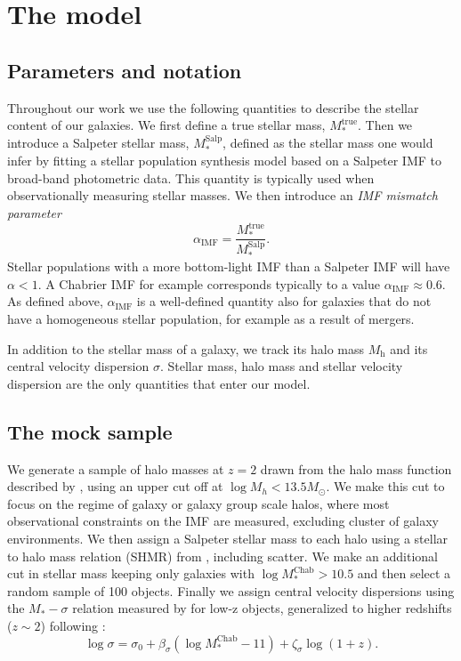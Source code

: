 \documentclass[usenatbib, letters]{mnras}
\def\mhalo{M_{\mathrm{h}}}
\def\mtrue{M_*^{\mathrm{true}}}
\def\mchab{M_*^{\mathrm{Chab}}}
\def\msalp{M_*^{\mathrm{Salp}}}
\def\aimf{\alpha_{\mathrm{IMF}}}
\begin{document}
\section{The model}\label{sect:model}

\subsection{Parameters and notation}
Throughout our work we use the following quantities to describe the stellar content of our galaxies. We first define a true stellar mass, $\mtrue$. Then we introduce a Salpeter stellar mass, $\msalp$, defined as the stellar mass one would infer by fitting a stellar population synthesis model based on a Salpeter IMF to broad-band photometric data. This quantity is typically used when observationally measuring stellar masses.
We then introduce an {\em IMF mismatch parameter}
\begin{equation}\label{eq:aimf}
\aimf = \frac{\mtrue}{\msalp}.
\end{equation}
Stellar populations with a more bottom-light IMF than a Salpeter IMF will have $\alpha<1$. A Chabrier IMF for example corresponds typically to a value $\aimf\approx0.6$.
As defined above, $\aimf$ is a well-defined quantity also for galaxies that do not have a homogeneous stellar population, for example as a result of mergers.

In addition to the stellar mass of a galaxy, we track its halo mass $\mhalo$ and its central velocity dispersion $\sigma$.
Stellar mass, halo mass and stellar velocity dispersion are the only quantities that enter our model.

\subsection{The mock sample}

We generate a sample of halo masses at $z=2$ drawn from the halo mass function described by \citet{Tin++08}, using an upper cut off at $\log{M_h} < 13.5M_\odot$.
We make this cut to focus on the regime of galaxy or galaxy group scale halos, where most observational constraints on the IMF are measured, excluding cluster of galaxy environments.
We then assign a Salpeter stellar mass to each halo using a stellar to halo mass relation (SHMR) from \citet{Lea++12}, including scatter.
We make an additional cut in stellar mass keeping only galaxies with $\log{\mchab} > 10.5$ and then select a random sample of 100 objects.
Finally we assign central velocity dispersions using the $M_*-\sigma$ relation measured by \citet{Aug++10} for low-z objects, generalized to higher redshifts ($z \sim 2$) following \citet{Mas++15}:
\begin{equation}\label{eq:mason}
\log{\sigma} = \sigma_0 + \beta_\sigma(\log{\mchab} - 11) + \zeta_\sigma\log{(1 + z)}.
\end{equation}
\end{document}
